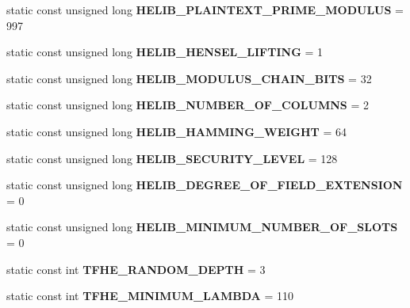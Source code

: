 \begin{DoxyCompactItemize}
\item 
\mbox{\label{classhomomorphine_1_1_constants_a25426ff47774d7ff0b88a0f7af1cfbb5}} 
static const unsigned long {\bfseries H\+E\+L\+I\+B\+\_\+\+P\+L\+A\+I\+N\+T\+E\+X\+T\+\_\+\+P\+R\+I\+M\+E\+\_\+\+M\+O\+D\+U\+L\+US} = 997
\item 
\mbox{\label{classhomomorphine_1_1_constants_a1392b13d6e1546225b95928311e53e85}} 
static const unsigned long {\bfseries H\+E\+L\+I\+B\+\_\+\+H\+E\+N\+S\+E\+L\+\_\+\+L\+I\+F\+T\+I\+NG} = 1
\item 
\mbox{\label{classhomomorphine_1_1_constants_a0dff16e6343989a60f4833605e45525f}} 
static const unsigned long {\bfseries H\+E\+L\+I\+B\+\_\+\+M\+O\+D\+U\+L\+U\+S\+\_\+\+C\+H\+A\+I\+N\+\_\+\+B\+I\+TS} = 32
\item 
\mbox{\label{classhomomorphine_1_1_constants_af08d97d4333bf772d742dddb6cac3af7}} 
static const unsigned long {\bfseries H\+E\+L\+I\+B\+\_\+\+N\+U\+M\+B\+E\+R\+\_\+\+O\+F\+\_\+\+C\+O\+L\+U\+M\+NS} = 2
\item 
\mbox{\label{classhomomorphine_1_1_constants_a86e3b8595c5ea2ed0be83f454dcc22d9}} 
static const unsigned long {\bfseries H\+E\+L\+I\+B\+\_\+\+H\+A\+M\+M\+I\+N\+G\+\_\+\+W\+E\+I\+G\+HT} = 64
\item 
\mbox{\label{classhomomorphine_1_1_constants_a043276f012d91267f62249aee29dfc04}} 
static const unsigned long {\bfseries H\+E\+L\+I\+B\+\_\+\+S\+E\+C\+U\+R\+I\+T\+Y\+\_\+\+L\+E\+V\+EL} = 128
\item 
\mbox{\label{classhomomorphine_1_1_constants_aac8aee7a978989ff544b02f8534fff24}} 
static const unsigned long {\bfseries H\+E\+L\+I\+B\+\_\+\+D\+E\+G\+R\+E\+E\+\_\+\+O\+F\+\_\+\+F\+I\+E\+L\+D\+\_\+\+E\+X\+T\+E\+N\+S\+I\+ON} = 0
\item 
\mbox{\label{classhomomorphine_1_1_constants_a94ae2d93d643d610ef822f8a06dde37f}} 
static const unsigned long {\bfseries H\+E\+L\+I\+B\+\_\+\+M\+I\+N\+I\+M\+U\+M\+\_\+\+N\+U\+M\+B\+E\+R\+\_\+\+O\+F\+\_\+\+S\+L\+O\+TS} = 0
\item 
\mbox{\label{classhomomorphine_1_1_constants_aa8ea7bb198826c9458fe8b975c1dcd64}} 
static const int {\bfseries T\+F\+H\+E\+\_\+\+R\+A\+N\+D\+O\+M\+\_\+\+D\+E\+P\+TH} = 3
\item 
\mbox{\label{classhomomorphine_1_1_constants_a8581d42bf2a8ffa81c2760f7fdd3c8a3}} 
static const int {\bfseries T\+F\+H\+E\+\_\+\+M\+I\+N\+I\+M\+U\+M\+\_\+\+L\+A\+M\+B\+DA} = 110
\end{DoxyCompactItemize}


